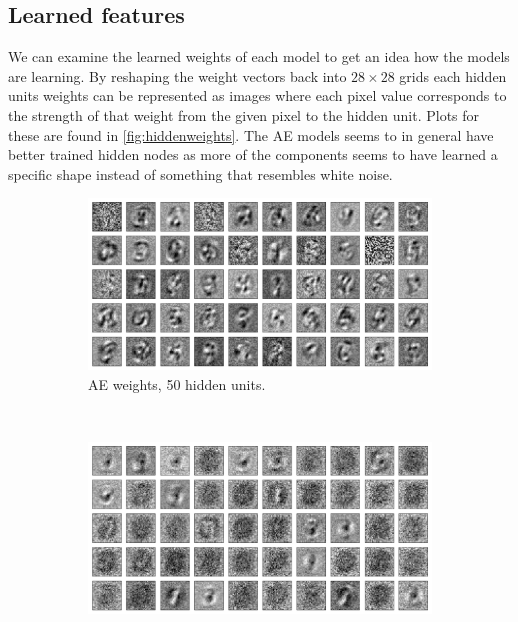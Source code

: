 \documentclass{article}
\begin{document}
\subsection{Learned features}
We can examine the learned weights of each model to get an idea how the models are learning.
By reshaping the weight vectors back into $28 \times 28$ grids
each hidden units weights can be represented as images
where each pixel value corresponds to the strength of that weight from the given pixel to the hidden unit.
Plots for these are found in \cref{fig:hiddenweights}.
The AE models seems to in general have better trained hidden nodes
as more of the components seems to have learned a specific shape
instead of something that resembles white noise.

\begin{figure}[!ht]
  \centering
  \begin{subfigure}[t]{0.47\textwidth}
    \centering
    \includegraphics[width=\textwidth]{../plots/3_1_2/last_layer_50_components_100e.png}
    \caption{AE weights, 50 hidden units.}
    \label{fig:w50ae}
  \end{subfigure}
  ~
  \addtocounter{subfigure}{1}
  \begin{subfigure}[t]{0.47\textwidth}
    \centering
    \includegraphics[width=\textwidth]{../plots/3_1_2/rbm_last_layer_50_components_20e.png}

\end{subfigure}
\end{figure}
\end{document}
